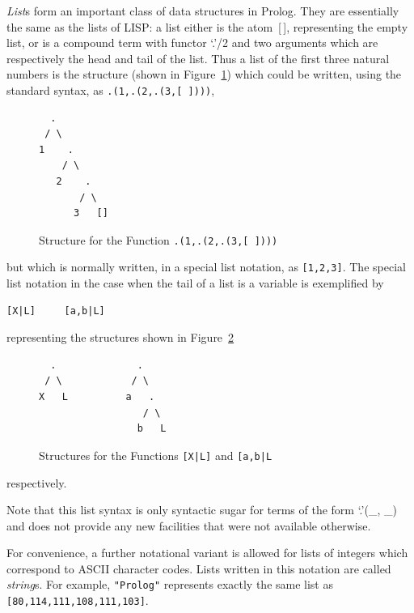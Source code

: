 {\em List}s form an important class of data structures in Prolog.
They are essentially the same as the lists of LISP:
a list either is the atom~[\,],
representing the empty list, or is a compound term with functor `.'/2
and two arguments which are respectively the head and tail of the list.
Thus a list of the first three natural numbers is the structure
(shown in Figure~\ref{list}) which could be written,
using the standard syntax, as {\tt .(1,.(2,.(3,[\,])))},
\begin{figure}[htbp]
\begin{center}
\begin{minipage}{1in}
\begin{verbatim}
  .
 / \
1    .
    / \
   2    .
       / \
      3   []
\end{verbatim}
\end{minipage}
\end{center}
\caption{Structure for the Function {\tt .(1,.(2,.(3,[\,])))}}\label{list}
\end{figure}
but which is normally written, in a special list notation, as {\tt [1,2,3]}.
The special list notation in the case when the tail of a list is a
variable is exemplified by
\begin{center}
\begin{minipage}{1.30in}
\begin{verbatim}
[X|L]     [a,b|L]
\end{verbatim}
\end{minipage}
\end{center}
representing the structures shown in Figure~\ref{structures}
\begin{figure}[htbp]
\begin{center}
\begin{minipage}{2.00in}
\begin{verbatim}
  .              .
 / \            / \
X   L          a   .
                  / \
                 b   L
\end{verbatim}
\end{minipage}
\end{center}
\caption{Structures for the Functions {\tt [X|L]} and {\tt [a,b|L}}
\label{structures}
\end{figure}
respectively.

Note that this list syntax is only syntactic sugar for terms of the form
`.'(\_, \_) and does not provide any new facilities that were not
available otherwise.

For convenience, a further notational variant is allowed for
lists of integers which correspond to ASCII character codes.
Lists written in this notation are called {\em string}s.
For example, {\tt "Prolog"} represents exactly the same list as
{\tt [80,114,111,108,111,103]}.


